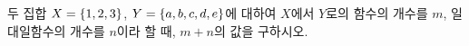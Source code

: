 두 집합 $X=\{1{,}\mkern3mu\mathopen{}2{,}\mkern3mu\mathopen{}3\}$, $Y=\{a{,}\mkern3mu\mathopen{}b{,}\mkern3mu\mathopen{}c{,}\mkern3mu\mathopen{}d{,}\mkern3mu\mathopen{}e\}$에 대하여 $X$에서 $Y$로의 함수의 개수를 $m$, 일대일함수의 개수를 $n$이라 할 때, $m+n$의 값을 구하시오.
